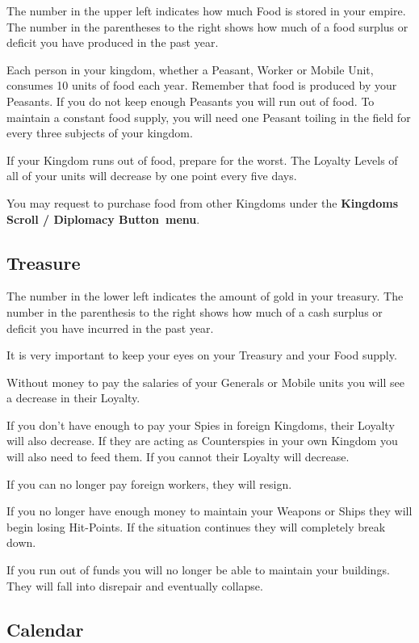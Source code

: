 The number in the upper left indicates how much Food is stored in your empire. The number in the parentheses to the right shows how much of a food surplus or deficit you have produced in the past year.

Each person in your kingdom, whether a Peasant, Worker or Mobile Unit, consumes 10 units of food each year. Remember that food is produced by your Peasants. If you do not keep enough Peasants you will run out of food. To maintain a constant food supply, you will need one Peasant toiling in the field for every three subjects of your kingdom.

If your Kingdom runs out of food, prepare for the worst. The Loyalty Levels of all of your units will decrease by one point every five days.

You may request to purchase food from other Kingdoms under the \textbf{Kingdoms Scroll / Diplomacy Button menu}.

\subsection{Treasure}

The number in the lower left indicates the amount of gold in your treasury. The number in the parenthesis to the right shows how much of a cash surplus or deficit you have incurred in the past year.

It is very important to keep your eyes on your Treasury and your Food supply.

Without money to pay the salaries of your Generals or Mobile units you will see a decrease in their Loyalty.

If you don’t have enough to pay your Spies in foreign Kingdoms, their Loyalty will also decrease. If they are acting as Counterspies in your own Kingdom you will also need to feed them. If you cannot their Loyalty will decrease.

If you can no longer pay foreign workers, they will resign.

If you no longer have enough money to maintain your Weapons or Ships they will begin losing Hit-Points. If the situation continues they will completely break down.

If you run out of funds you will no longer be able to maintain your buildings. They will fall into disrepair and eventually collapse.

\subsection{Calendar}


